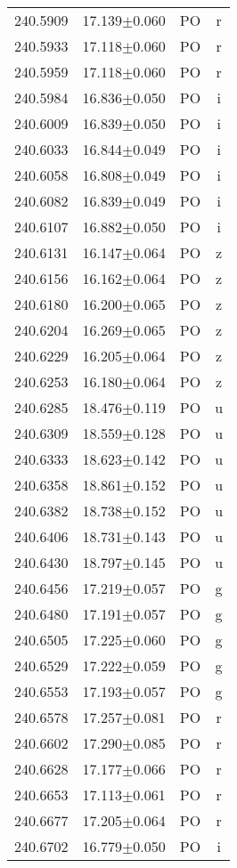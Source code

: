\begin{table}
\begin{tabular}{cccc}
240.5909 & 17.139$\pm$0.060 & PO & r \\
240.5933 & 17.118$\pm$0.060 & PO & r \\
240.5959 & 17.118$\pm$0.060 & PO & r \\
240.5984 & 16.836$\pm$0.050 & PO & i \\
240.6009 & 16.839$\pm$0.050 & PO & i \\
240.6033 & 16.844$\pm$0.049 & PO & i \\
240.6058 & 16.808$\pm$0.049 & PO & i \\
240.6082 & 16.839$\pm$0.049 & PO & i \\
240.6107 & 16.882$\pm$0.050 & PO & i \\
240.6131 & 16.147$\pm$0.064 & PO & z \\
240.6156 & 16.162$\pm$0.064 & PO & z \\
240.6180 & 16.200$\pm$0.065 & PO & z \\
240.6204 & 16.269$\pm$0.065 & PO & z \\
240.6229 & 16.205$\pm$0.064 & PO & z \\
240.6253 & 16.180$\pm$0.064 & PO & z \\
240.6285 & 18.476$\pm$0.119 & PO & u \\
240.6309 & 18.559$\pm$0.128 & PO & u \\
240.6333 & 18.623$\pm$0.142 & PO & u \\
240.6358 & 18.861$\pm$0.152 & PO & u \\
240.6382 & 18.738$\pm$0.152 & PO & u \\
240.6406 & 18.731$\pm$0.143 & PO & u \\
240.6430 & 18.797$\pm$0.145 & PO & u \\
240.6456 & 17.219$\pm$0.057 & PO & g \\
240.6480 & 17.191$\pm$0.057 & PO & g \\
240.6505 & 17.225$\pm$0.060 & PO & g \\
240.6529 & 17.222$\pm$0.059 & PO & g \\
240.6553 & 17.193$\pm$0.057 & PO & g \\
240.6578 & 17.257$\pm$0.081 & PO & r \\
240.6602 & 17.290$\pm$0.085 & PO & r \\
240.6628 & 17.177$\pm$0.066 & PO & r \\
240.6653 & 17.113$\pm$0.061 & PO & r \\
240.6677 & 17.205$\pm$0.064 & PO & r \\
240.6702 & 16.779$\pm$0.050 & PO & i \\

\end{tabular}
\end{table}
